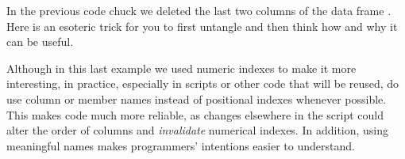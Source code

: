 \documentclass[krantz2]{krantz}\usepackage{knitr}%
\begin{document}
\begin{playground}
In the previous code chuck we deleted the last two columns of the data frame .
Here is an esoteric trick for you to first untangle and then think how and why it can be useful.

\begin{knitrout}\footnotesize
{}\color{fgcolor}\begin{kframe}
\begin{alltt}
\hlstd{a.df[}\hlopt{:}\hlstd{,} \hlstd{(}\hlstd{,}\hlstd{)]} \hlkwb{<-} \hlstd{a.df[}\hlopt{:}\hlstd{,} \hlstd{(}\hlstd{,}\hlstd{)]}
\end{alltt}
\end{kframe}
\end{knitrout}
\end{playground}

\begin{warningbox}
Although in this last example we used numeric indexes to make it more interesting, in practice, especially in scripts or other code that will be reused, do use column or member names instead of positional indexes whenever possible. This makes code much more reliable, as changes elsewhere in the script could alter the order of columns and \emph{invalidate} numerical indexes. In addition, using meaningful names makes programmers' intentions easier to understand.
\end{warningbox}
\end{document}
